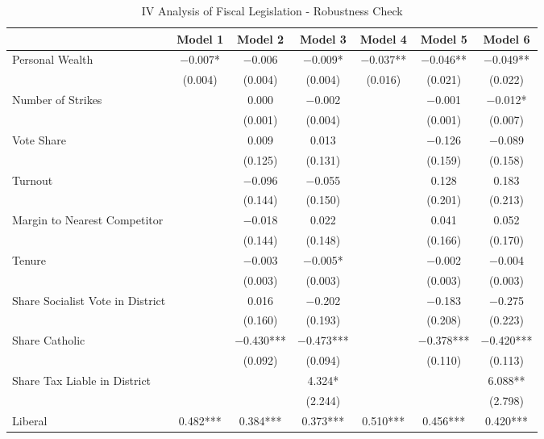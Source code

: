 \begin{table}

\caption{\label{tab:fisc_nw0_ols_iv}IV Analysis of Fiscal Legislation - Robustness Check}
\centering
\begin{tabular}[t]{lcccccc}
\toprule
  & Model 1 & Model 2 & Model 3 & Model 4 & Model 5 & Model 6\\
\midrule
Personal Wealth & \num{-0.007}* & \num{-0.006} & \num{-0.009}* & \num{-0.037}** & \num{-0.046}** & \num{-0.049}**\\
 & (\num{0.004}) & (\num{0.004}) & (\num{0.004}) & (\num{0.016}) & (\num{0.021}) & (\num{0.022})\\
Number of Strikes &  & \num{0.000} & \num{-0.002} &  & \num{-0.001} & \num{-0.012}*\\
 &  & (\num{0.001}) & (\num{0.004}) &  & (\num{0.001}) & (\num{0.007})\\
Vote Share &  & \num{0.009} & \num{0.013} &  & \num{-0.126} & \num{-0.089}\\
 &  & (\num{0.125}) & (\num{0.131}) &  & (\num{0.159}) & (\num{0.158})\\
Turnout &  & \num{-0.096} & \num{-0.055} &  & \num{0.128} & \num{0.183}\\
 &  & (\num{0.144}) & (\num{0.150}) &  & (\num{0.201}) & (\num{0.213})\\
Margin to Nearest Competitor &  & \num{-0.018} & \num{0.022} &  & \num{0.041} & \num{0.052}\\
 &  & (\num{0.144}) & (\num{0.148}) &  & (\num{0.166}) & (\num{0.170})\\
Tenure &  & \num{-0.003} & \num{-0.005}* &  & \num{-0.002} & \num{-0.004}\\
 &  & (\num{0.003}) & (\num{0.003}) &  & (\num{0.003}) & (\num{0.003})\\
Share Socialist Vote in District &  & \num{0.016} & \num{-0.202} &  & \num{-0.183} & \num{-0.275}\\
 &  & (\num{0.160}) & (\num{0.193}) &  & (\num{0.208}) & (\num{0.223})\\
Share Catholic &  & \num{-0.430}*** & \num{-0.473}*** &  & \num{-0.378}*** & \num{-0.420}***\\
 &  & (\num{0.092}) & (\num{0.094}) &  & (\num{0.110}) & (\num{0.113})\\
Share Tax Liable in District &  &  & \num{4.324}* &  &  & \num{6.088}**\\
 &  &  & (\num{2.244}) &  &  & (\num{2.798})\\
Liberal & \num{0.482}*** & \num{0.384}*** & \num{0.373}*** & \num{0.510}*** & \num{0.456}*** & \num{0.420}***\\

\end{tabular}
\end{table}
